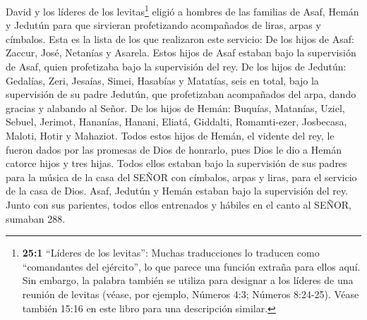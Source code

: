  David y los líderes de los levitas\footnote{\textbf{25:1}
  ``Líderes de los levitas'': Muchas traducciones lo traducen como
  ``comandantes del ejército'', lo que parece una función extraña para
  ellos aquí. Sin embargo, la palabra también se utiliza para designar a
  los líderes de una reunión de levitas (véase, por ejemplo, Números
  4:3; Números 8:24-25). Véase también 15:16 en este libro para una
  descripción similar.} eligió a hombres de las familias de Asaf, Hemán
y Jedutún para que sirvieran profetizando acompañados de liras, arpas y
címbalos. Esta es la lista de los que realizaron este servicio:
 De los hijos de Asaf: Zaccur, José, Netanías y Asarela.
Estos hijos de Asaf estaban bajo la supervisión de Asaf, quien
profetizaba bajo la supervisión del rey.  De los hijos de
Jedutún: Gedalías, Zeri, Jesaías, Simei, Hasabías y Matatías, seis en
total, bajo la supervisión de su padre Jedutún, que profetizaban
acompañados del arpa, dando gracias y alabando al Señor.  De
los hijos de Hemán: Buquías, Matanías, Uziel, Sebuel, Jerimot, Hananías,
Hanani, Eliatá, Giddalti, Romamti-ezer, Josbecasa, Maloti, Hotir y
Mahaziot.  Todos estos hijos de Hemán, el vidente del rey,
le fueron dados por las promesas de Dios de honrarlo, pues Dios le dio a
Hemán catorce hijos y tres hijas.  Todos ellos estaban bajo
la supervisión de sus padres para la música de la casa del SEÑOR con
címbalos, arpas y liras, para el servicio de la casa de Dios. Asaf,
Jedutún y Hemán estaban bajo la supervisión del rey.  Junto
con sus parientes, todos ellos entrenados y hábiles en el canto al
SEÑOR, sumaban 288.

